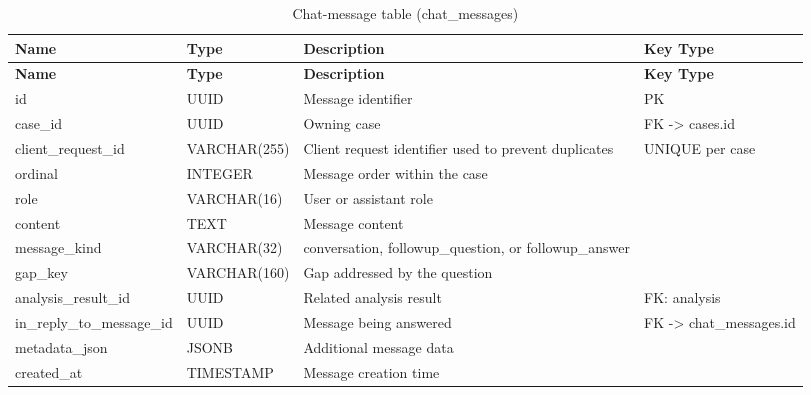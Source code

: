 \begin{longtable}{@{}>{\raggedright\arraybackslash}p{} >{\raggedright\arraybackslash}p{} >{\raggedright\arraybackslash}p{} >{\raggedright\arraybackslash}p{}@{}}
\caption{Chat-message table (chat\_messages)}\label{tab:3-14}\\
\toprule
\textbf{Name} & \textbf{Type} & \textbf{Description} & \textbf{Key Type} \\
\midrule
\endfirsthead
\textbf{Name} & \textbf{Type} & \textbf{Description} & \textbf{Key Type} \\
\midrule
\endhead
id & UUID & Message identifier & PK \\
case\_id & UUID & Owning case & FK -> cases.id \\
client\_request\_id & VARCHAR(255) & Client request identifier used to prevent duplicates & UNIQUE per case \\
ordinal & INTEGER & Message order within the case &  \\
role & VARCHAR(16) & User or assistant role &  \\
content & TEXT & Message content &  \\
message\_kind & VARCHAR(32) & conversation, followup\_question, or followup\_answer &  \\
gap\_key & VARCHAR(160) & Gap addressed by the question &  \\
analysis\_result\_id & UUID & Related analysis result & FK: analysis \\
in\_reply\_to\_message\_id & UUID & Message being answered & FK -> chat\_messages.id \\
metadata\_json & JSONB & Additional message data &  \\
created\_at & TIMESTAMP & Message creation time &  \\
\bottomrule
\end{longtable}


